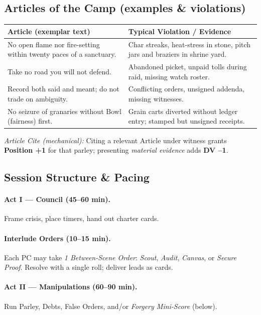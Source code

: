\documentclass[11pt]{article}
\begin{document}
\subsection*{Articles of the Camp (examples \& violations)}
\begin{center}\small
\begin{longtable}{p{}p{}}
\toprule
\textbf{Article (exemplar text)} & \textbf{Typical Violation / Evidence} \\
\midrule
No open flame nor fire-setting within twenty paces of a sanctuary. & Char streaks, heat-stress in stone, pitch jars and braziers in shrine yard. \\
Take no road you will not defend. & Abandoned picket, unpaid tolls during raid, missing watch roster. \\
Record both said and meant; do not trade on ambiguity. & Conflicting orders, unsigned addenda, missing witnesses. \\
No seizure of granaries without Bowl (fairness) first. & Grain carts diverted without ledger entry; stamped but unsigned receipts. \\
\bottomrule
\end{longtable}
\end{center}
\textit{Article Cite (mechanical):} Citing a relevant Article under witness grants \textbf{Position +1} for that parley; presenting \emph{material evidence} adds \textbf{DV --1}.

\subsection*{Session Structure \& Pacing}
\paragraph{Act I --- Council (45--60 min).} Frame crisis, place timers, hand out charter cards.
\paragraph{Interlude Orders (10--15 min).} Each PC may take \emph{1 Between-Scene Order}: \emph{Scout}, \emph{Audit}, \emph{Canvas}, or \emph{Secure Proof}. Resolve with a single roll; deliver leads as cards.
\paragraph{Act II --- Manipulations (60--90 min).} Run Parley, Debts, False Orders, and/or \emph{Forgery Mini-Score} (below).
\end{document}
